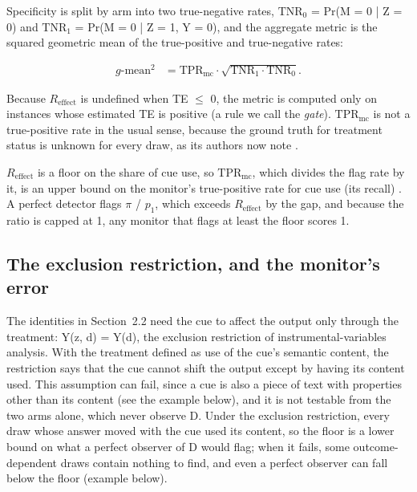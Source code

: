 \documentclass[11pt]{article}
\begin{document}
Specificity is split by arm into two true-negative rates, $\mathrm{TNR}_0$ = Pr(M = 0 | Z = 0) and $\mathrm{TNR}_1$ = Pr(M = 0 | Z = 1, Y = 0), and the aggregate metric is the squared geometric mean of the true-positive and true-negative rates:

\begin{align*}
  g\text{-}\mathrm{mean}^2 &= \mathrm{TPR}_{\mathrm{mc}} \cdot  \sqrt{\mathrm{TNR}_1 \cdot  \mathrm{TNR}_0}.
\end{align*}

Because $R_{\mathrm{effect}}$ is undefined when TE $\leq$ 0, the metric is computed only on instances whose estimated TE is positive (a rule we call the \emph{gate}). $\mathrm{TPR}_{\mathrm{mc}}$ is not a true-positive rate in the usual sense, because the ground truth for treatment status is unknown for every draw, as its authors now note \citep*{guan2026beyond}.

$R_{\mathrm{effect}}$ is a floor on the share of cue use, so $\mathrm{TPR}_{\mathrm{mc}}$, which divides the flag rate by it, is an upper bound on the monitor’s true-positive rate for cue use (its recall) \citep*{guan2026beyond}. A perfect detector flags $\pi$ / $p_1$, which exceeds $R_{\mathrm{effect}}$ by the gap, and because the ratio is capped at 1, any monitor that flags at least the floor scores 1.

\subsection{The exclusion restriction, and the monitor’s error}
The identities in Section~2.2 need the cue to affect the output only through the treatment: Y(z, d) = Y(d), the exclusion restriction of instrumental-variables analysis. With the treatment defined as use of the cue’s semantic content, the restriction says that the cue cannot shift the output except by having its content used. This assumption can fail, since a cue is also a piece of text with properties other than its content (see the example below), and it is not testable from the two arms alone, which never observe D. Under the exclusion restriction, every draw whose answer moved with the cue used its content, so the floor is a lower bound on what a perfect observer of D would flag; when it fails, some outcome-dependent draws contain nothing to find, and even a perfect observer can fall below the floor (example below).
\end{document}
